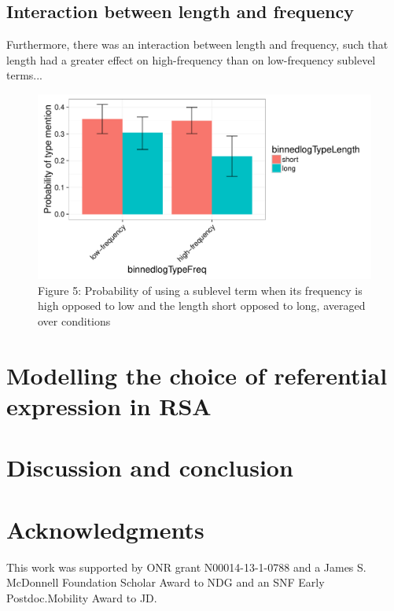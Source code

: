 \documentclass[10pt,letterpaper]{article}
\begin{document}
\subsection{\bf Interaction between length and frequency}
Furthermore, there was an interaction between length and frequency, such that length had a greater effect on high-frequency than on low-frequency sublevel terms...

\begin{figure}[ht!]
\centering
\includegraphics[width=.5\textwidth]{graphs/freq-length-interaction-noconds}
\caption{Figure 5: Probability of using a sublevel term when its frequency is high opposed to low and the length short opposed to long, averaged over conditions \label{overflow}}
\end{figure}

\section{\bf Modelling the choice of referential expression in RSA}

\section{\bf Discussion and conclusion}

\section{\bf Acknowledgments}

This work was supported by ONR grant N00014-13-1-0788 and a James S. McDonnell Foundation Scholar Award to NDG and an SNF Early Postdoc.Mobility Award to JD.

\small




\setlength{\bibleftmargin}{.125in}
\setlength{\bibindent}{-\bibleftmargin}


\end{document}
